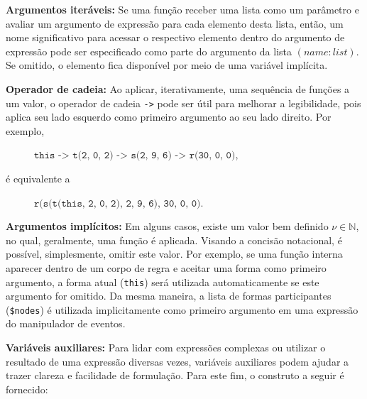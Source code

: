 \textbf{Argumentos iteráveis:} Se uma função receber uma lista como um parâmetro e avaliar um argumento de expressão para cada elemento desta lista, então, um nome significativo para acessar o respectivo elemento dentro do argumento de expressão pode ser especificado como parte do argumento da lista $(name:list)$. Se omitido, o elemento fica disponível por meio de uma variável implícita.

\textbf{Operador de cadeia:} Ao aplicar, iterativamente, uma sequência de funções a um valor, o operador de cadeia \texttt{->} pode ser útil para melhorar a legibilidade, pois aplica seu lado esquerdo como primeiro argumento ao seu lado direito. Por exemplo,

\vspace{0.3cm}

\begin{description}
    \item[] \qquad \qquad $\texttt{this -> t(2, 0, 2) -> s(2, 9, 6) -> r(30, 0, 0)}$,
\end{description}

\vspace{0.3cm}

\noindent é equivalente a

\vspace{0.3cm}

\begin{description}
    \item[] \qquad \qquad $\texttt{r(s(t(this, 2, 0, 2), 2, 9, 6), 30, 0, 0)}$.
\end{description}

\vspace{0.3cm}

\textbf{Argumentos implícitos:} Em alguns casos, existe um valor bem definido $\nu \in \mathbb{N}$, no qual, geralmente, uma função é aplicada. Visando a concisão notacional, é possível, simplesmente, omitir este valor. Por exemplo, se uma função interna aparecer dentro de um corpo de regra e aceitar uma forma como primeiro argumento, a forma atual (\texttt{this}) será utilizada automaticamente se este argumento for omitido. Da mesma maneira, a lista de formas participantes (\texttt{\$nodes}) é utilizada implicitamente como primeiro argumento em uma expressão do manipulador de eventos.

\textbf{Variáveis auxiliares:} Para lidar com expressões complexas ou utilizar o resultado de uma expressão diversas vezes, variáveis auxiliares podem ajudar a trazer clareza e facilidade de formulação. Para este fim, o construto a seguir é fornecido:

